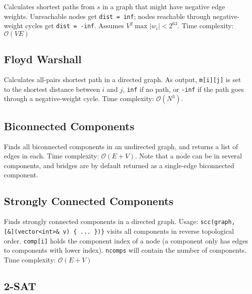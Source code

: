 \documentclass{article}
\begin{document}
Calculates shortest paths from $s$ in a graph that might have negative edge weights.
Unreachable nodes get \lstinline{dist = inf}; nodes reachable through negative-weight cycles get \lstinline{dist = -inf}.
Assumes $V^2 \max |w_i| < 2^{63}$. Time complexity: $\mathcal{O}(VE)$




\subsection*{Floyd Warshall}
Calculates all-pairs shortest path in a directed graph.
As output, \lstinline{m[i][j]} is set to the shortest distance between $i$ and $j$,
\lstinline{inf} if no path, or \lstinline{-inf} if the path goes through a negative-weight cycle.
Time complexity: $\mathcal{O}(N^3)$.





\subsection*{Biconnected Components}

Finds all biconnected components in an undirected graph, and returns a list of edges in each. Time complexity: $\mathcal{O}(E + V)$.
Note that a node can be in several components, and bridges are by default returned as a single-edge biconnected component.





\subsection*{Strongly Connected Components}

Finds strongly connected components in a directed graph.
Usage: \lstinline|scc(graph, [&](vector<int>& v) { ... })}| visits all components
in reverse topological order. \texttt{comp[i]} holds the component
index of a node (a component only has edges to components with
lower index). \texttt{ncomps} will contain the number of components.
Time complexity: $\mathcal{O}(E + V)$



\subsection*{2-SAT}
\end{document}
